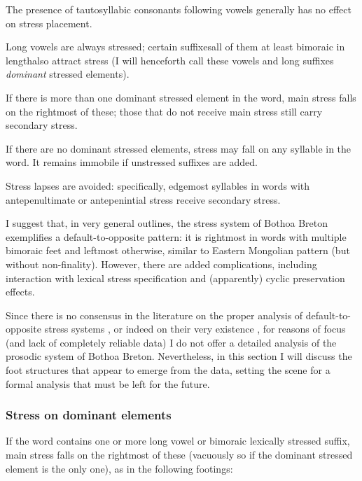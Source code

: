 \begin{itemize*}
\item The presence of tautosyllabic consonants following vowels generally has no effect on stress placement.
\item Long vowels are always stressed; certain suffixes\dash all of them at least bimoraic in length\dash also attract stress (I will henceforth call these vowels and long suffixes \emph{dominant} stressed elements).
\item If there is more than one dominant stressed element in the word, main stress falls on the rightmost of these; those that do not receive main stress still carry secondary stress.
\item If there are no dominant stressed elements, stress may fall on any syllable in the word. It remains immobile if unstressed suffixes are added.
\item Stress lapses are avoided: specifically, edgemost syllables in words with antepenultimate or antepenintial stress receive secondary stress.
\end{itemize*}

I suggest that, in very general outlines, the stress system of Bothoa Breton exemplifies a default-to-opposite pattern: it is rightmost in words with multiple bimoraic feet and leftmost otherwise, similar to  Eastern Mongolian pattern (but without non-finality). However, there are added complications, including interaction with lexical stress specification and (apparently) cyclic preservation effects.

Since there is no consensus in the literature on the proper analysis of default\hyp to\hyp opposite stress systems \citep{zoll97:_confl,walker2000,bakovic04:_unboun,hyde06:_towar}, or indeed on their very existence \citep{gordon00:_re}, for reasons of focus (and lack of completely reliable data) I do not offer a detailed analysis of the prosodic system of Bothoa Breton. Nevertheless, in this section I will discuss the foot structures that appear to emerge from the data, setting the scene for a formal analysis that must be left for the future.

\subsubsection{Stress on dominant elements}
\label{sec:stress-with-multiple}

If the word contains one or more long vowel or bimoraic lexically stressed suffix, main stress falls on the rightmost of these (vacuously so if the dominant stressed element is the only one), as in the following footings:

